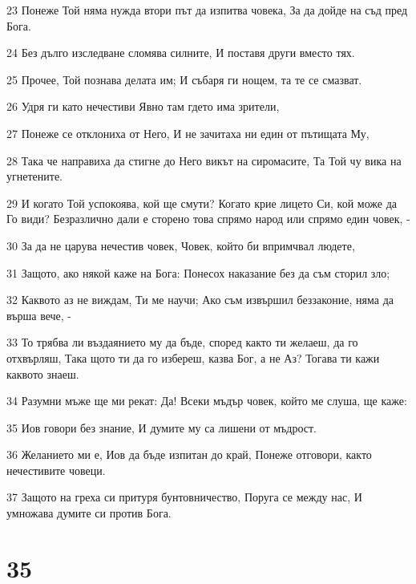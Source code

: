 \par 23 Понеже Той няма нужда втори път да изпитва човека, За да дойде на съд пред Бога.
\par 24 Без дълго изследване сломява силните, И поставя други вместо тях.
\par 25 Прочее, Той познава делата им; И събаря ги нощем, та те се смазват.
\par 26 Удря ги като нечестиви Явно там гдето има зрители,
\par 27 Понеже се отклониха от Него, И не зачитаха ни един от пътищата Му,
\par 28 Така че направиха да стигне до Него викът на сиромасите, Та Той чу вика на угнетените.
\par 29 И когато Той успокоява, кой ще смути? Когато крие лицето Си, кой може да Го види? Безразлично дали е сторено това спрямо народ или спрямо един човек, -
\par 30 За да не царува нечестив човек, Човек, който би впримчвал людете,
\par 31 Защото, ако някой каже на Бога: Понесох наказание без да съм сторил зло;
\par 32 Каквото аз не виждам, Ти ме научи; Ако съм извършил беззаконие, няма да върша вече, -
\par 33 То трябва ли въздаянието му да бъде, според както ти желаеш, да го отхвърляш, Така щото ти да го избереш, казва Бог, а не Аз? Тогава ти кажи каквото знаеш.
\par 34 Разумни мъже ще ми рекат: Да! Всеки мъдър човек, който ме слуша, ще каже:
\par 35 Иов говори без знание, И думите му са лишени от мъдрост.
\par 36 Желанието ми е, Иов да бъде изпитан до край, Понеже отговори, както нечестивите човеци.
\par 37 Защото на греха си притуря бунтовничество, Поруга се между нас, И умножава думите си против Бога.

\chapter{35}

